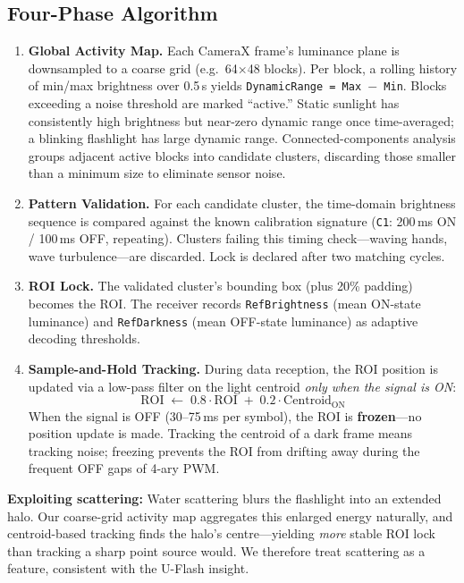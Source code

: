 \documentclass[10pt,a4paper]{article}
\begin{document}
\subsection*{Four-Phase Algorithm}
\begin{enumerate}[leftmargin=*, itemsep=4pt, topsep=5pt, label=\textbf{Phase \arabic*.}]

\item \textbf{Global Activity Map.}
Each CameraX frame's luminance plane is downsampled to a coarse grid
(e.g.\ 64$\times$48 blocks). Per block, a rolling history of min/max brightness
over 0.5\,s yields \texttt{DynamicRange = Max $-$ Min}.
Blocks exceeding a noise threshold are marked ``active.''
Static sunlight has consistently high brightness but near-zero dynamic range once
time-averaged; a blinking flashlight has large dynamic range.
Connected-components analysis groups adjacent active blocks into candidate clusters,
discarding those smaller than a minimum size to eliminate sensor noise.

\item \textbf{Pattern Validation.}
For each candidate cluster, the time-domain brightness sequence is compared against
the known calibration signature (\texttt{C1}: 200\,ms ON / 100\,ms OFF, repeating).
Clusters failing this timing check---waving hands, wave turbulence---are discarded.
Lock is declared after two matching cycles.

\item \textbf{ROI Lock.}
The validated cluster's bounding box (plus 20\% padding) becomes the ROI.
The receiver records \texttt{RefBrightness} (mean ON-state luminance) and
\texttt{RefDarkness} (mean OFF-state luminance) as adaptive decoding thresholds.

\item \textbf{Sample-and-Hold Tracking.}
During data reception, the ROI position is updated via a low-pass filter on
the light centroid \emph{only when the signal is ON}:
\[
  \mathrm{ROI} \;\leftarrow\; 0.8\cdot\mathrm{ROI} \;+\; 0.2\cdot\mathrm{Centroid}_{\mathrm{ON}}
\]
When the signal is OFF (30--75\,ms per symbol), the ROI is \textbf{frozen}---no
position update is made.
Tracking the centroid of a dark frame means tracking noise; freezing prevents
the ROI from drifting away during the frequent OFF gaps of 4-ary PWM.
\end{enumerate}

\noindent\textbf{Exploiting scattering:}
Water scattering blurs the flashlight into an extended halo.
Our coarse-grid activity map aggregates this enlarged energy naturally,
and centroid-based tracking finds the halo's centre---yielding \emph{more} stable
ROI lock than tracking a sharp point source would.
We therefore treat scattering as a feature, consistent with the U-Flash insight.
\end{document}

